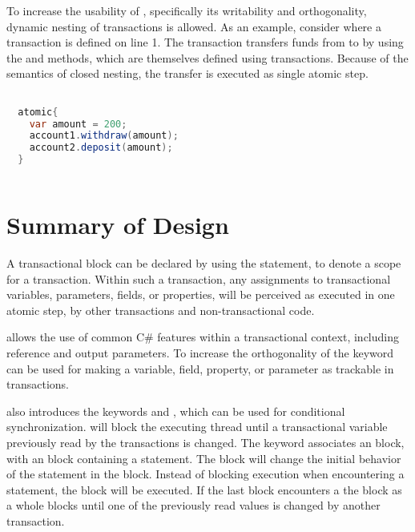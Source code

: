 To increase the usability of \stmname, specifically its writability and orthogonality, dynamic nesting of transactions is allowed. As an example, consider  where a transaction is defined on line 1. The transaction transfers funds from  to  by using the  and  methods, which are themselves defined using transactions. Because of the semantics of closed nesting, the transfer is executed as single atomic step.

\begin{lstlisting}[label=lst:stm_nested_transactions_real,
 caption={Dynamically nested transactions},
 language=Java, 
 showspaces=false,
 showtabs=false,
 breaklines=true,
 showstringspaces=false,
 breakatwhitespace=true,
 commentstyle=\color{greencomments},
 keywordstyle=\color{bluekeywords},
 stringstyle=\color{redstrings},
 morekeywords={atomic, retry, orElse, var}]  % Start your code-block

  atomic{
    var amount = 200;
    account1.withdraw(amount);
    account2.deposit(amount);
  }
     
\end{lstlisting}

\section{Summary of Design}\label{sec:summary_design}
A transactional block can be declared by using the  statement, to denote a scope for a transaction. Within such a transaction, any assignments to transactional variables, parameters, fields, or properties, will be perceived as executed in one atomic step, by other transactions and non-transactional code.

\stmname allows the use of common C\# features within a transactional context, including reference and output parameters. To increase the orthogonality of \stmname the  keyword can be used for making a variable, field, property, or parameter as trackable in transactions.

\stmnamesp also introduces the keywords  and , which can be used for conditional synchronization.  will block the executing thread until a transactional variable previously read by the transactions is changed. The  keyword associates an  block, with an  block containing a  statement. The  block will change the initial behavior of the  statement in the  block. Instead of blocking execution when encountering a  statement, the  block will be executed. If the last  block encounters a  the  block as a whole blocks until one of the previously read values is changed by another transaction.

